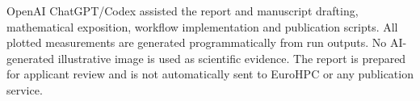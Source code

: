\documentclass[11pt,a4paper]{article}
\begin{document}
OpenAI ChatGPT/Codex assisted the report and manuscript drafting,
mathematical exposition, workflow implementation and publication scripts.
All plotted measurements are generated programmatically from run outputs.
No AI-generated illustrative image is used as scientific evidence.
The report is prepared for applicant review and is not automatically
sent to EuroHPC or any publication service.


\end{document}

